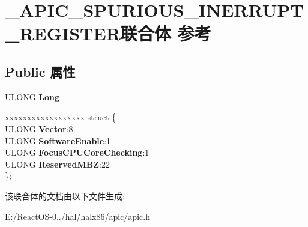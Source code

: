\hypertarget{union___a_p_i_c___s_p_u_r_i_o_u_s___i_n_e_r_r_u_p_t___r_e_g_i_s_t_e_r}{}\section{\+\_\+\+A\+P\+I\+C\+\_\+\+S\+P\+U\+R\+I\+O\+U\+S\+\_\+\+I\+N\+E\+R\+R\+U\+P\+T\+\_\+\+R\+E\+G\+I\+S\+T\+E\+R联合体 参考}
\label{union___a_p_i_c___s_p_u_r_i_o_u_s___i_n_e_r_r_u_p_t___r_e_g_i_s_t_e_r}
\subsection*{Public 属性}
\begin{DoxyCompactItemize}
\item 
\mbox{\label{union___a_p_i_c___s_p_u_r_i_o_u_s___i_n_e_r_r_u_p_t___r_e_g_i_s_t_e_r_a48a849355e2c9c18605fafc37bbc877a}} 
U\+L\+O\+NG {\bfseries Long}
\item 
\mbox{\label{union___a_p_i_c___s_p_u_r_i_o_u_s___i_n_e_r_r_u_p_t___r_e_g_i_s_t_e_r_a0171b41128378d879e52c53f82a2bb8b}} 
\begin{tabbing}
xx\=xx\=xx\=xx\=xx\=xx\=xx\=xx\=xx\=\kill
struct \{\\
\>ULONG {\bfseries Vector}:8\\
\>ULONG {\bfseries SoftwareEnable}:1\\
\>ULONG {\bfseries FocusCPUCoreChecking}:1\\
\>ULONG {\bfseries ReservedMBZ}:22\\
\}; \\

\end{tabbing}\end{DoxyCompactItemize}


该联合体的文档由以下文件生成\+:\begin{DoxyCompactItemize}
\item 
E\+:/\+React\+O\+S-\/0../hal/halx86/apic/apic.\+h\end{DoxyCompactItemize}
